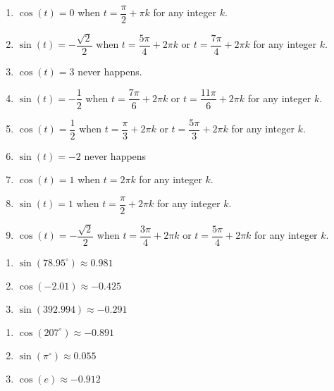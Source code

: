 \begin{enumerate}

\setcounter{enumi}{\value{HW}}

\item $\cos(t) = 0$ when $t = \dfrac{\pi}{2} + \pi k$ for any integer $k$.
\item $\sin(t) = -\dfrac{\sqrt{2}}{2}$ when $t = \dfrac{5\pi}{4} + 2\pi k$ or $t = \dfrac{7\pi}{4} + 2\pi k$ for any integer $k$.
\item $\cos(t) = 3$ never happens.  
\item $\sin(t) = -\dfrac{1}{2}$ when $t = \dfrac{7\pi}{6} + 2\pi k$ or $t = \dfrac{11\pi}{6} + 2\pi k$ for any integer $k$.
\item $\cos(t) = \dfrac{1}{2}$ when $t = \dfrac{\pi}{3} + 2\pi k$ or $t = \dfrac{5\pi}{3} + 2\pi k$ for any integer $k$.
\item $\sin(t) = -2$ never happens
\item $\cos(t) = 1$ when $t = 2\pi k$ for any integer $k$.
\item $\sin(t) = 1$ when $t = \dfrac{\pi}{2} + 2\pi k$ for any integer $k$.
\item $\cos(t) = -\dfrac{\sqrt{2}}{2}$ when $t = \dfrac{3\pi}{4} + 2\pi k$ or $t = \dfrac{5\pi}{4} + 2\pi k$ for any integer $k$.

\setcounter{HW}{\value{enumi}}

\end{enumerate}

\begin{multicols}{3}

\begin{enumerate}

\setcounter{enumi}{\value{HW}}

\item $\sin(78.95^{\circ}) \approx 0.981$
\item $\cos(-2.01) \approx -0.425$
\item $\sin(392.994) \approx -0.291$

\setcounter{HW}{\value{enumi}}

\end{enumerate}

\end{multicols}

\begin{multicols}{3}

\begin{enumerate}

\setcounter{enumi}{\value{HW}}

\item $\cos(207^{\circ}) \approx -0.891$
\item $\sin\left( \pi^{\circ} \right) \approx 0.055$
\item $\cos(e) \approx -0.912$

\setcounter{HW}{\value{enumi}}

\end{enumerate}

\end{multicols}

